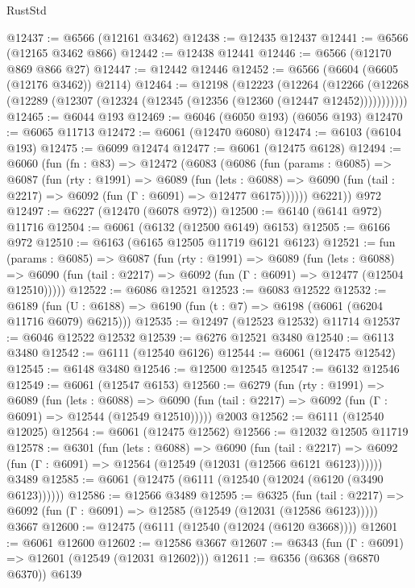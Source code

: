 \begin{lexlean}{RustStd}
\begin{coremodule}
@12437 := @6566 (@12161 @3462)
@12438 := @12435 @12437
@12441 := @6566 (@12165 @3462 @866)
@12442 := @12438 @12441
@12446 := @6566 (@12170 @869 @866 @27)
@12447 := @12442 @12446
@12452 := @6566 (@6604 (@6605 (@12176 @3462)) @2114)
@12464 := @12198
    (@12223
      (@12264
        (@12266 (@12268 (@12289 (@12307 (@12324 (@12345 (@12356 (@12360 (@12447 @12452)))))))))))
@12465 := @6044 @193
@12469 := @6046 (@6050 @193) (@6056 @193)
@12470 := @6065 @11713
@12472 := @6061 (@12470 @6080)
@12474 := @6103 (@6104 @193)
@12475 := @6099 @12474
@12477 := @6061 (@12475 @6128)
@12494 := @6060
    (fun (fn : @83) =>
    @12472
      (@6083
        (@6086
          (fun (params : @6085) =>
          @6087
            (fun (rty : @1991) =>
            @6089
              (fun (lets : @6088) =>
              @6090 (fun (tail : @2217) => @6092 (fun (Γ : @6091) => @12477 @6175))))))
        @6221))
    @972
@12497 := @6227 (@12470 (@6078 @972))
@12500 := @6140 (@6141 @972) @11716
@12504 := @6061 (@6132 (@12500 @6149) @6153)
@12505 := @6166 @972
@12510 := @6163 (@6165 @12505 @11719 @6121 @6123)
@12521 := fun (params : @6085) =>
  @6087
    (fun (rty : @1991) =>
    @6089
      (fun (lets : @6088) =>
      @6090 (fun (tail : @2217) => @6092 (fun (Γ : @6091) => @12477 (@12504 @12510)))))
@12522 := @6086 @12521
@12523 := @6083 @12522
@12532 := @6189
    (fun (U : @6188) => @6190 (fun (t : @7) => @6198 (@6061 (@6204 @11716 @6079) @6215)))
@12535 := @12497 (@12523 @12532) @11714
@12537 := @6046 @12522 @12532
@12539 := @6276 @12521 @3480
@12540 := @6113 @3480
@12542 := @6111 (@12540 @6126)
@12544 := @6061 (@12475 @12542)
@12545 := @6148 @3480
@12546 := @12500 @12545
@12547 := @6132 @12546
@12549 := @6061 (@12547 @6153)
@12560 := @6279
    (fun (rty : @1991) =>
    @6089
      (fun (lets : @6088) =>
      @6090 (fun (tail : @2217) => @6092 (fun (Γ : @6091) => @12544 (@12549 @12510)))))
    @2003
@12562 := @6111 (@12540 @12025)
@12564 := @6061 (@12475 @12562)
@12566 := @12032 @12505 @11719
@12578 := @6301
    (fun (lets : @6088) =>
    @6090
      (fun (tail : @2217) =>
      @6092 (fun (Γ : @6091) => @12564 (@12549 (@12031 (@12566 @6121 @6123))))))
    @3489
@12585 := @6061 (@12475 (@6111 (@12540 (@12024 (@6120 (@3490 @6123))))))
@12586 := @12566 @3489
@12595 := @6325
    (fun (tail : @2217) => @6092 (fun (Γ : @6091) => @12585 (@12549 (@12031 (@12586 @6123)))))
    @3667
@12600 := @12475 (@6111 (@12540 (@12024 (@6120 @3668))))
@12601 := @6061 @12600
@12602 := @12586 @3667
@12607 := @6343 (fun (Γ : @6091) => @12601 (@12549 (@12031 @12602)))
@12611 := @6356 (@6368 (@6870 @6370)) @6139

\end{coremodule}
\end{lexlean}

